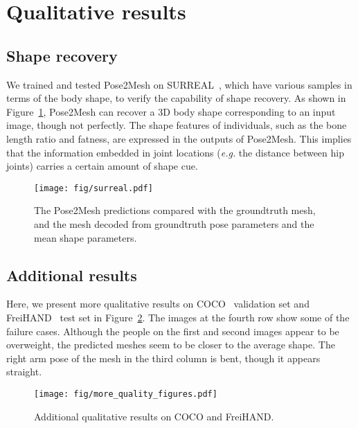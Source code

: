 \documentclass[runningheads]{llncs}
\begin{document}
\section{Qualitative results}
\subsection{Shape recovery}
We trained and tested Pose2Mesh on SURREAL~\cite{varol2017surreal}, which have various samples in terms of the body shape, to verify the capability of shape recovery.
As shown in Figure~\ref{fig:surreal}, Pose2Mesh can recover a 3D body shape corresponding to an input image, though not perfectly.
The shape features of individuals, such as the bone length ratio and fatness, are expressed in the outputs of Pose2Mesh.
This implies that the information embedded in joint locations (\textit{e.g.} the distance between hip joints) carries a certain amount of shape cue.

\begin{figure}[!hbt]
\setlength\belowcaptionskip{-5ex}
\centerline{
\texttt{[image: fig/surreal.pdf]}}
\vspace*{-1mm}
\caption
{
The Pose2Mesh predictions compared with the groundtruth mesh, and the mesh decoded from groundtruth pose parameters and the mean shape parameters.
}
\label{fig:surreal}
\end{figure}

\subsection{Additional results}
Here, we present more qualitative results on COCO~\cite{lin2014mscoco} validation set and FreiHAND~\cite{chris2019Freihand} test set in Figure~\ref{fig:more_quality_figures.pdf}.
The images at the fourth row show some of the failure cases. 
Although the people on the first and second images appear to be overweight, the predicted meshes seem to be closer to the average shape.
The right arm pose of the mesh in the third column is bent, though it appears straight.


\begin{figure}[!hbt]
\setlength\belowcaptionskip{-5ex}
\centerline{
\texttt{[image: fig/more\_quality\_figures.pdf]}}
\vspace*{-1mm}
\caption
{
Additional qualitative results on COCO and FreiHAND.
}
\label{fig:more_quality_figures.pdf}
\end{figure}
\end{document}
